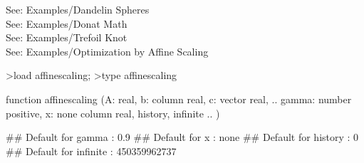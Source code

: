 \documentclass[a4paper,10pt]{article}
\begin{document}
\begin{eulernotebook}
\begin{eulercomment}
\begin{eulercomment}
\begin{eulercomment}
See: Examples/Dandelin Spheres\\
See: Examples/Donat Math\\
See: Examples/Trefoil Knot\\
See: Examples/Optimization by Affine Scaling
\end{eulercomment}
\begin{eulerprompt}
>load affinescaling;
>type affinescaling
\end{eulerprompt}
\begin{euleroutput}
  function affinescaling (A: real, b: column real, c: vector real,  ..
  gamma: number positive, x: none column real, history, infinite ..
  )
  
  ## Default for gamma : 0.9
  ## Default for x : none
  ## Default for history : 0
  ## Default for infinite : 450359962737
  

\end{euleroutput}
\end{eulercomment}
\end{eulercomment}
\end{eulernotebook}
\end{document}
